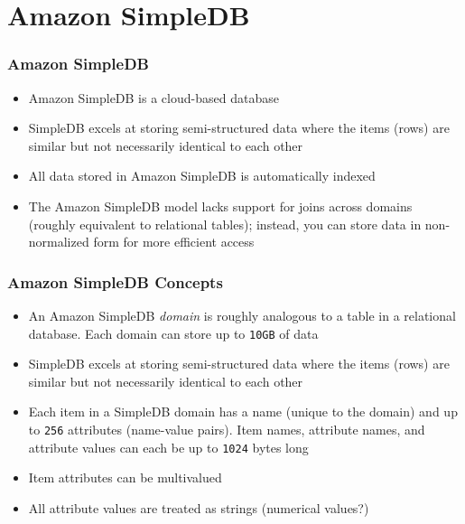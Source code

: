 \documentclass{beamer}
\begin{document}
\section{Amazon SimpleDB}
\begin{frame}[fragile]
\frametitle{Amazon SimpleDB}
\begin{itemize}
 \item Amazon SimpleDB is a cloud-based database
 \item SimpleDB excels at storing semi-structured data where the items (rows) are similar but not necessarily identical to each other
 \item All data stored in Amazon SimpleDB is automatically indexed
 \item The Amazon SimpleDB model lacks support for joins across domains (roughly
equivalent to relational tables); instead, you can store data in non-normalized form
for more efficient access
\end{itemize}
\end{frame}
\begin{frame}[fragile]
\frametitle{Amazon SimpleDB Concepts}
\begin{itemize}
 \item An Amazon SimpleDB \emph{domain} is roughly analogous to a table in a relational database.  Each domain can store up to \texttt{10GB} of data
 \item SimpleDB excels at storing semi-structured data where the items (rows) are similar but not necessarily identical to each other
 \item Each item in a SimpleDB domain has a name (unique to the domain) and up to \texttt{256} attributes (name-value pairs).
       Item names, attribute names, and attribute values can each be up to \texttt{1024} bytes long
 \item Item attributes can be multivalued 
 \item All attribute values are treated as strings (\alert{numerical values?})
\end{itemize}
\end{frame}
\end{document}
